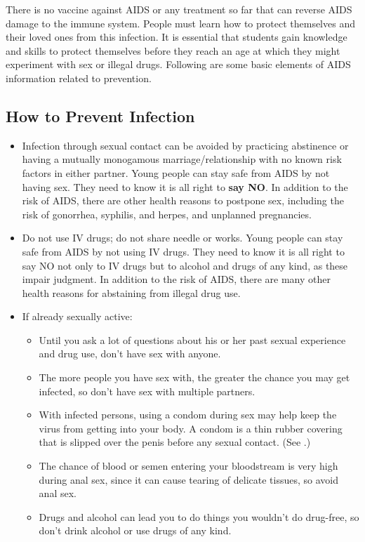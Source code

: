 There is no vaccine against AIDS or any treatment so far that can reverse AIDS damage to
the immune system. People must learn how to protect themselves and their loved ones from
this infection. It is essential that students gain knowledge and skills to protect themselves
before they reach an age at which they might experiment with sex or illegal drugs. Following
are some basic elements of AIDS information related to prevention.

\subsection{How to Prevent Infection}

\begin{itemize}
\item Infection through sexual contact can be avoided by practicing abstinence or having a
mutually monogamous marriage/relationship with no known risk factors in either partner.
Young people can stay safe from AIDS by not having sex. They need to know it is all right
to \textbf{say NO}. In addition to the risk of AIDS, there are other health reasons to postpone sex,
including the risk of gonorrhea, syphilis, and herpes, and unplanned pregnancies.
\item Do not use IV drugs; do not share needle or works. Young people can stay safe from
AIDS by not using IV drugs. They need to know it is all right to say NO not only to IV drugs
but to alcohol and drugs of any kind, as these impair judgment. In addition to the risk of
AIDS, there are many other health reasons for abstaining from illegal drug use.
\item If already sexually active:
	\begin{itemize}
	\item Until you ask a lot of questions about his or her past sexual experience and drug use,
don't have sex with anyone.
	\item The more people you have sex with, the greater the chance you may get infected, so
don't have sex with multiple partners.
	\item With infected persons, using a condom during sex may help keep the virus from
getting into your body. A condom is a thin rubber covering that is slipped over the penis
before any sexual contact. (See .)
	\item The chance of blood or semen entering your bloodstream is very high during anal sex,
since it can cause tearing of delicate tissues, so avoid anal sex.
	\item Drugs and alcohol can lead you to do things you wouldn't do drug-free, so don't drink
alcohol or use drugs of any kind.
	\end{itemize}
\end{itemize}

